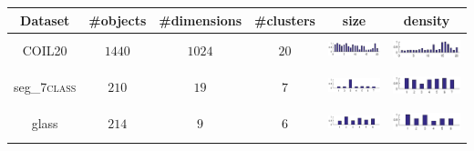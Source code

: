 \begin{table}[!htbp]
\centering
\resizebox{0.9\linewidth}{!}
{
\begin{tabular}{|c|c|c|c|c|c|} \hline
Dataset & \#objects & \#dimensions & \#clusters & size & density\\ \hline 
COIL20 &$1440$ & $1024$ & $20$ & \begin{minipage}{0.2\textwidth}\centering\includegraphics[height=8mm]{figure/COIL20_size.eps}\end{minipage} & \begin{minipage}{0.2\textwidth}\centering\includegraphics[height=8mm]{figure/COIL20_den.eps}\end{minipage} \\ \hline
seg\_7\textsc{class} &$210$ & $19$ & $7$ & \begin{minipage}{0.2\textwidth}\centering\includegraphics[height=8mm]{figure/seg_size.eps}\end{minipage} & \begin{minipage}{0.2\textwidth}\centering\includegraphics[height=8mm]{figure/seg_den.eps}\end{minipage} \\ \hline
glass &$214$ & $9$ & $6$  & \begin{minipage}{0.2\textwidth}\centering\includegraphics[height=8mm]{figure/glass_size.eps}\end{minipage} & \begin{minipage}{0.2\textwidth}\centering\includegraphics[height=8mm]{figure/glass_den.eps}\end{minipage} \\ \hline

\end{tabular}}
\end{table}
